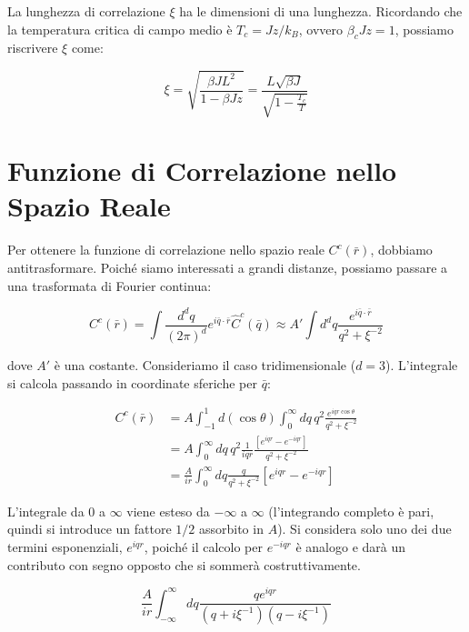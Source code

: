 La lunghezza di correlazione $\xi$ ha le dimensioni di una lunghezza. Ricordando che la temperatura critica di campo medio è $T_c = Jz/k_B$, ovvero $\beta_c J z = 1$, possiamo riscrivere $\xi$ come:

\begin{equation} \label{eq:ch19_25}
\xi = \sqrt{\frac{\beta J L^2}{1 - \beta J z}} = \frac{L \sqrt{\beta J}}{\sqrt{1 - \frac{T_c}{T}}}
\end{equation}


\section{Funzione di Correlazione nello Spazio Reale}
Per ottenere la funzione di correlazione nello spazio reale $C^c(\bar{r})$, dobbiamo antitrasformare.
Poiché siamo interessati a grandi distanze, possiamo passare a una trasformata di Fourier continua:

\begin{equation} \label{eq:ch19_26}
C^c(\bar{r}) = \int \frac{d^d q}{(2\pi)^d} e^{i\bar{q}\cdot\bar{r}} \hat{C}^c(\bar{q}) \approx A' \int d^d q \frac{e^{i\bar{q}\cdot\bar{r}}}{q^2 + \xi^{-2}}
\end{equation}

dove $A'$ è una costante.
Consideriamo il caso tridimensionale ($d=3$). L'integrale si calcola passando in coordinate sferiche per $\bar{q}$:

\begin{align} \label{eq:ch19_27}
C^c(\bar{r}) &= A \int_{-1}^{1} d(\cos\theta) \int_0^\infty dq \, q^2 \frac{e^{iqr\cos\theta}}{q^2 + \xi^{-2}} \nonumber \\ 
&=  A \int_0^\infty dq \, q^2 \frac{1}{iqr} \frac{[e^{iqr} - e^{-iqr}]}{q^2 + \xi^{-2}}  \nonumber \\ 
&= \frac{A}{ir} \int_0^\infty dq \frac{q}{q^2 + \xi^{-2}} [e^{iqr} - e^{-iqr}]
\end{align}

L'integrale da $0$ a $\infty$ viene esteso da $-\infty$ a $\infty$ (l'integrando completo è pari, quindi si introduce un fattore $1/2$ assorbito in $A$).
Si considera solo uno dei due termini esponenziali, $e^{iqr}$, poiché il calcolo per $e^{-iqr}$ è analogo e darà un contributo con segno opposto che si sommerà costruttivamente.

\begin{equation*}
\frac{A}{ir} \int_{-\infty}^\infty dq \frac{q e^{iqr}}{(q+i\xi^{-1})(q-i\xi^{-1})}
\end{equation*}

